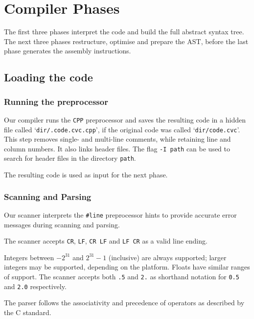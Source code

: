 \documentclass[a4paper,11pt]{report}
\begin{document}
\chapter{Compiler Phases}
The first three phases interpret the code and build the full abstract syntax tree. The next three phases restructure, optimise and prepare the AST, before the last phase generates the assembly instructions.

\section{Loading the code}
\subsection{Running the preprocessor}
Our compiler runs the \texttt{CPP} preprocessor and saves the resulting code in a hidden file called `\texttt{dir/.code.cvc.cpp}', if the original code was called `\texttt{dir/code.cvc}'. This step removes single- and multi-line comments, while retaining line and column numbers. It also links header files. The flag \texttt{-I path} can be used to search for header files in the directory \texttt{path}.

The resulting code is used as input for the next phase.

\subsection{Scanning and Parsing}
Our scanner interprets the \texttt{\#line} preprocessor hints to provide accurate error messages during scanning and parsing.

The scanner accepts \texttt{CR}, \texttt{LF}, \texttt{CR LF} and \texttt{LF CR} as a valid line ending.

Integers between $-2^{31}$ and $2^{31}-1$ (inclusive) are always supported; larger integers may be supported, depending on the platform. Floats have similar ranges of support. The scanner accepts both \texttt{.5} and \texttt{2.} as shorthand notation for \texttt{0.5} and \texttt{2.0} respectively.

The parser follows the associativity and precedence of operators as described by the C standard.
\end{document}
